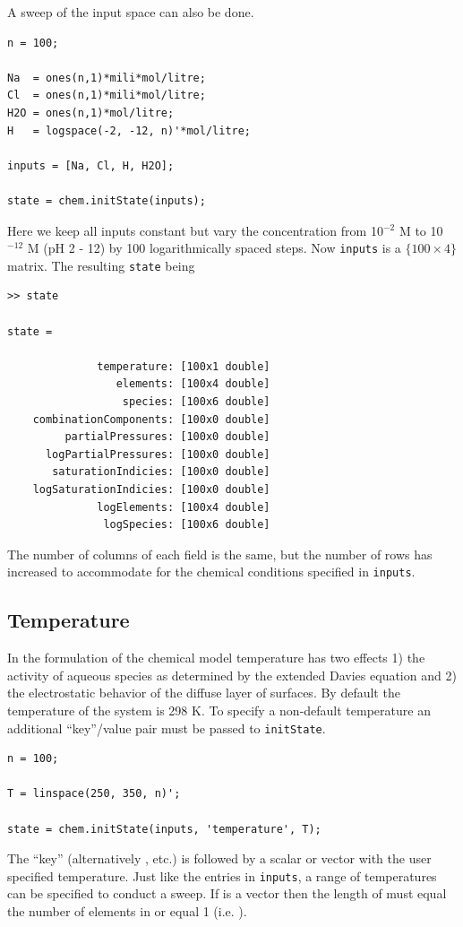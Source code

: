 \documentclass{article}
\begin{document}
A sweep of the input space can also be done.

\begin{lstlisting}
n = 100;

Na  = ones(n,1)*mili*mol/litre;
Cl  = ones(n,1)*mili*mol/litre;
H2O = ones(n,1)*mol/litre;
H   = logspace(-2, -12, n)'*mol/litre;

inputs = [Na, Cl, H, H2O];

state = chem.initState(inputs);
\end{lstlisting}
Here we keep all inputs constant but vary the  concentration from 10$^{-2}$ M to 10$^{-12}$ M (pH 2 - 12) by 100 logarithmically spaced steps. Now \verb|inputs| is a $\{100\times 4\}$ matrix. The resulting \verb|state| being

\begin{lstlisting}
>> state

state = 

              temperature: [100x1 double]
                 elements: [100x4 double]
                  species: [100x6 double]
    combinationComponents: [100x0 double]
         partialPressures: [100x0 double]
      logPartialPressures: [100x0 double]
       saturationIndicies: [100x0 double]
    logSaturationIndicies: [100x0 double]
              logElements: [100x4 double]
               logSpecies: [100x6 double]

\end{lstlisting}
The number of columns of each field is the same, but the number of rows has increased to accommodate for the chemical conditions specified in \verb|inputs|.

\subsection{Temperature}

In the formulation of the chemical model temperature has two effects 1) the activity of aqueous species as determined by the extended Davies equation and 2) the electrostatic behavior of the diffuse layer of surfaces. By default the temperature of the system is 298 \textdegree K. To specify a non-default temperature an additional ``key''/value pair must be passed to \verb|initState|. 
\begin{lstlisting}
n = 100;

T = linspace(250, 350, n)';

state = chem.initState(inputs, 'temperature', T);
\end{lstlisting}
The ``key''  (alternatively ,  etc.) is followed by a scalar or vector with the user specified temperature. Just like the entries in \verb|inputs|, a range of temperatures can be specified to conduct a sweep. If  is a vector then the length of  must equal the number of elements in  or equal 1 (i.e.  ).
\end{document}
